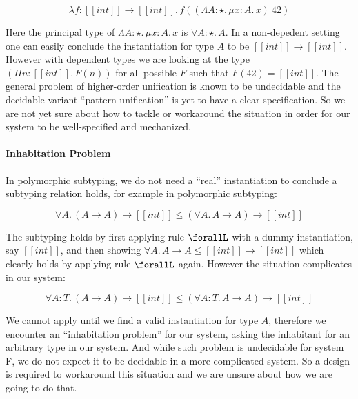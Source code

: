 \begin{equation*}
    \lambda f : [[int]] \rightarrow [[int]].\, f ((\Lambda A : \star.\,\mu x : A.\, x)~42)
\end{equation*}

Here the principal type of $\Lambda A : \star.\,\mu x : A.\, x$ is $\forall A : \star.\, A$.
In a non-depedent setting one can easily conclude the instantiation for type $A$ to be
 $[[int]] \rightarrow [[int]]$. However with dependent types we are looking at
the type $(\Pi n : [[int]].\, F(n))$ for all possible $F$ such that $F(42) = [[int]]$.
The general problem of higher-order unification is known to be undecidable\cite{goldfarb1981undecidability}
and the decidable variant ``pattern unification''\cite{miller1991unification}
is yet to have a clear specification.
So we are not yet sure about how to tackle or workaround the situation in order
for our system to be well-specified and mechanized.

\paragraph{Inhabitation Problem}

In polymorphic subtyping, we do not need a ``real'' instantiation to conclude
a subtyping relation holds, for example in polymorphic subtyping:

\begin{equation*}
    \forall A.\, (A \rightarrow A) \rightarrow [[int]] \le (\forall A.\, A \rightarrow A) \rightarrow [[int]]
\end{equation*}

The subtyping holds by first applying rule $\forallL$ with a dummy instantiation,
say $[[int]]$, and then showing $\forall A.\, A \rightarrow A \le [[int]] \rightarrow [[int]]$
which clearly holds by applying rule $\forallL$ again. However the situation
complicates in our system:

\begin{equation*}
    \forall A : T.\, (A \rightarrow A) \rightarrow [[int]] \le (\forall A : T.\, A \rightarrow A) \rightarrow [[int]]
\end{equation*}

We cannot apply  until we find a valid instantiation for type $A$,
therefore we encounter an ``inhabitation problem'' for our system, asking the
inhabitant for an arbitrary type in our system. And while such problem is
undecidable for system F\cite{dudenhefner2019simpler}, we do not expect it to be
decidable in a more complicated system. So a design is required to workaround
this situation and we are unsure about how we are going to do that.
